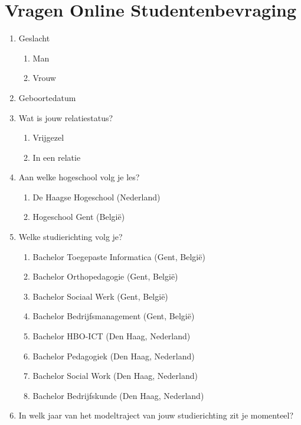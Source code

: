 
\chapter{Vragen Online Studentenbevraging}
\label{ch:vragenlijst}

\begin{enumerate}
	\item Geslacht
	\begin{enumerate}
		\item Man
		\item Vrouw
	\end{enumerate}
	\item Geboortedatum
	\item Wat is jouw relatiestatus?
	\begin{enumerate}
		\item Vrijgezel
		\item In een relatie
	\end{enumerate}
	\item Aan welke hogeschool volg je les?
	\begin{enumerate}
		\item De Haagse Hogeschool (Nederland)
		\item Hogeschool Gent (België)
	\end{enumerate}
	\item Welke studierichting volg je?
	\begin{enumerate}
		\item Bachelor Toegepaste Informatica (Gent, België)
		\item Bachelor Orthopedagogie (Gent, België)
		\item Bachelor Sociaal Werk (Gent, België)
		\item Bachelor Bedrijfsmanagement (Gent, België)
		\item Bachelor HBO-ICT (Den Haag, Nederland)
		\item Bachelor Pedagogiek (Den Haag, Nederland)
		\item Bachelor Social Work (Den Haag, Nederland)
		\item Bachelor Bedrijfskunde (Den Haag, Nederland)
	\end{enumerate}
	\item In welk jaar van het modeltraject van jouw studierichting zit je momenteel?
	\begin{enumerate}

\end{enumerate}
\end{enumerate}
